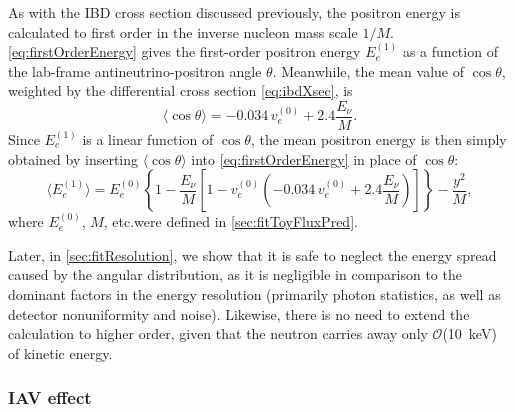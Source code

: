 \documentclass[../thesis.tex]{subfiles}
\begin{document}
As with the IBD cross section discussed previously, the positron energy is calculated to first order in the inverse nucleon mass scale $1/M$. \autoref{eq:firstOrderEnergy} gives the first-order positron energy $E_e^{(1)}$ as a function of the lab-frame antineutrino-positron angle $\theta$. Meanwhile, the mean value of $\cos\theta$, weighted by the differential cross section \autoref{eq:ibdXsec}, is \cite{Vogel_1999}
\begin{equation}
  \label{eq:meanIbdAngle}
  \langle \cos \theta \rangle = -0.034\, v_e^{(0)} + 2.4 \frac{E_\nu}{M}.
\end{equation}
Since $E_e^{(1)}$ is a linear function of $\cos\theta$, the mean positron energy is then simply obtained by inserting $\langle \cos\theta \rangle$ into \autoref{eq:firstOrderEnergy} in place of $\cos\theta$:
\begin{equation}
  \label{eq:firstOrderEnergyMean}
  \langle E_e^{(1)} \rangle = E_e^{(0)}
  \left\{1 - \frac{E_{\nu}}{M}\left[1 - v_e^{(0)} \left(-0.034\, v_e^{(0)} + 2.4 \frac{E_\nu}{M}\right)\right] \right\}
  - \frac{y^2}{M},
\end{equation}
where $E_e^{(0)}$, $M$, etc.\@ were defined in \autoref{sec:fitToyFluxPred}.

Later, in \autoref{sec:fitResolution}, we show that it is safe to neglect the energy spread caused by the angular distribution, as it is negligible in comparison to the dominant factors in the energy resolution (primarily photon statistics, as well as detector nonuniformity and noise). Likewise, there is no need to extend the calculation to higher order, given that the neutron carries away only $\mathcal{O}$(10~keV) of kinetic energy.

\subsubsection{IAV effect}
\label{sec:fitIavEffect}

\newcommand\Miav{\mathbf{M}^{\mathrm{IAV}}}
\newcommand\Eetrue[1]{E^{\mathrm{true}}_{e#1}}
\newcommand\Eels[1]{E^{\mathrm{LS}}_{e#1}}
\end{document}
